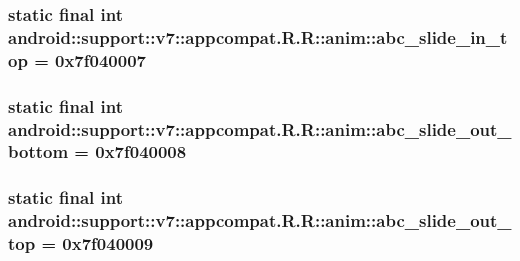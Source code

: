 \hypertarget{classandroid_1_1support_1_1v7_1_1appcompat_1_1_r_1_1anim_333487deecb252cdae314ebbb560ef8d}{
\subsubsection[{abc\_\-slide\_\-in\_\-top}]{\setlength{\rightskip}{0pt plus 5cm}static final int android::support::v7::appcompat.R.R::anim::abc\_\-slide\_\-in\_\-top = 0x7f040007}}
\label{classandroid_1_1support_1_1v7_1_1appcompat_1_1_r_1_1anim_333487deecb252cdae314ebbb560ef8d}


\hypertarget{classandroid_1_1support_1_1v7_1_1appcompat_1_1_r_1_1anim_4fe9e67b4088eca4f9dfe38c24f28cf0}{
\subsubsection[{abc\_\-slide\_\-out\_\-bottom}]{\setlength{\rightskip}{0pt plus 5cm}static final int android::support::v7::appcompat.R.R::anim::abc\_\-slide\_\-out\_\-bottom = 0x7f040008}}
\label{classandroid_1_1support_1_1v7_1_1appcompat_1_1_r_1_1anim_4fe9e67b4088eca4f9dfe38c24f28cf0}


\hypertarget{classandroid_1_1support_1_1v7_1_1appcompat_1_1_r_1_1anim_38fb846f4fe9fdc3e76e64611b52e549}{
\subsubsection[{abc\_\-slide\_\-out\_\-top}]{\setlength{\rightskip}{0pt plus 5cm}static final int android::support::v7::appcompat.R.R::anim::abc\_\-slide\_\-out\_\-top = 0x7f040009}}
\label{classandroid_1_1support_1_1v7_1_1appcompat_1_1_r_1_1anim_38fb846f4fe9fdc3e76e64611b52e549}


